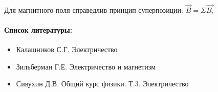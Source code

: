 \documentclass{article}
\begin{document}
\paragraph{}

Для магнитного поля справедлив принцип суперпозиции: $\vec{B} = \Sigma\vec{B_i}$

\paragraph{Список литературы:}

\begin{itemize}
\item
  Калашников С.Г. Электричество
\item
  Зильберман Г.Е. Электричество и магнетизм
\item
  Сивухин Д.В. Общий курс физики. Т.3. Электричество
\end{itemize}
\end{document}
